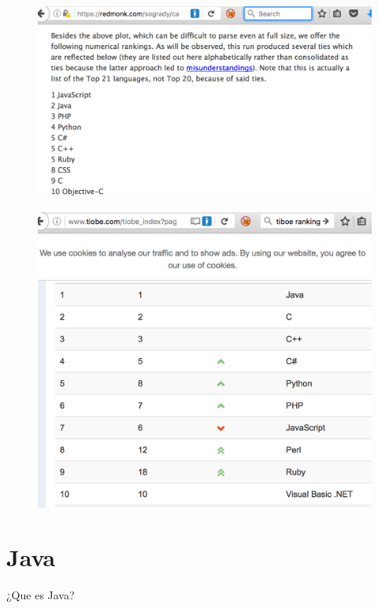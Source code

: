 \documentclass{beamer}
\begin{document}
\begin{frame}
\begin{figure}
\centering
\includegraphics[width=0.9\linewidth]{Images/redmonk}
\end{figure}
\end{frame}

\begin{frame}
\begin{figure}
\centering
\includegraphics[width=0.9\linewidth]{Images/tiboe}
\end{figure}
\end{frame}

\section{Java}
\begin{frame}
\huge ¿Que es Java?
\end{frame}
\end{document}
